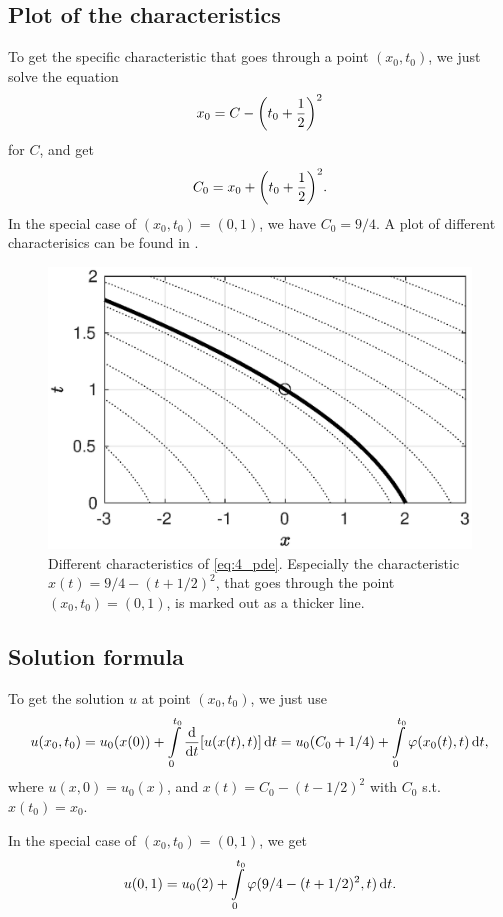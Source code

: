 \documentclass[11pt,letter, swedish, english
]{article}
\begin{document}
\subsection{Plot of the characteristics}

To get the specific characteristic that goes through a point
$(x_0, t_0)$, we just solve the equation
\begin{equation}
x_0 = C - \qty(t_0 + \frac{1}{2})^2
\end{equation}
for $C$, and get
\begin{equation}
C_0 = x_0 + \qty(t_0 + \frac{1}{2})^2.
\end{equation}
In the special case of $(x_0, t_0) = (0, 1)$, we have $C_0 = 9/4$. A
plot of different characterisics can be found in .

\begin{figure}
\centering
\includegraphics[width=.7\textwidth]{4b.eps}
\caption{Different characteristics of \eqref{eq:4_pde}. Especially the
  characteristic $x(t) = 9/4 -(t+1/2)^2$, that goes through the
  point $(x_0, t_0) = (0, 1)$, is marked out as a thicker line.} 
\label{fig:4b}
\end{figure}

\subsection{Solution formula}
To get the solution $u$ at point $(x_0, t_0)$, we just use
\begin{equation}
u(x_0, t_0) = u_0(x(0)) + \int_0^{t_0} \dv{t}[u(x(t), t)]\id{t}
=u_0(C_0+1/4) + \int_0^{t_0} \varphi(x_0(t), t) \id{t},
\end{equation}
where $u(x, 0) = u_0(x)$, and $x(t) = C_0 - (t-1/2)^2$ with $C_0$
s.t. $x(t_0)=x_0$.

In the special case of $(x_0, t_0) = (0, 1)$, we get
\begin{equation}
u(0, 1) = u_0(2) 
+ \int_0^{t_0} \varphi(9/4-(t+1/2)^2, t) \id{t}.
\end{equation}
\end{document}

